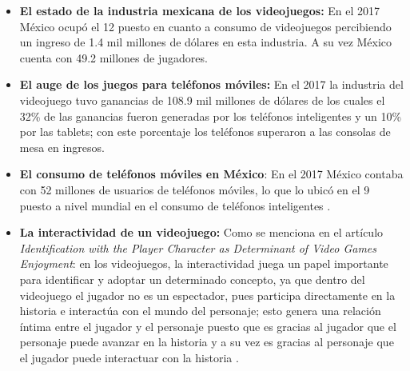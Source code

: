 \begin{itemize}
    \item \textbf{El estado de la industria mexicana de los videojuegos:} En el
    2017 México ocupó el 12 puesto en cuanto a consumo de videojuegos percibiendo
    un ingreso de 1.4 mil millones de dólares en esta industria. A su vez México
    cuenta con 49.2 millones de jugadores\cite{Ref_JuegosGanancia}.

    \item \textbf{El auge de los juegos para teléfonos móviles:} En el 2017 la
    industria del videojuego tuvo ganancias de 108.9 mil millones de dólares de
    los cuales el 32\% de las ganancias fueron generadas por los teléfonos
    inteligentes y un 10\% por las tablets; con este porcentaje los teléfonos
    superaron a las consolas de mesa en ingresos\cite{Ref_JuegosGanancia}.

    \item \textbf{El consumo de teléfonos móviles en México}: En el 2017 México
    contaba con 52 millones de usuarios de teléfonos móviles, lo que lo ubicó en
    el 9 puesto a nivel mundial en el consumo de teléfonos inteligentes
    \cite{Ref_TelefonosGanancia}.

    \item \textbf{La interactividad de un videojuego:} Como se menciona en el
    artículo \textit{Identification with the Player Character as Determinant
    of Video Games Enjoyment}: en los videojuegos, la interactividad juega un
    papel importante para identificar y adoptar un determinado concepto, ya que
    dentro del videojuego el jugador no es un espectador, pues participa
    directamente en la historia e interactúa con el mundo del personaje; esto
    genera una relación íntima entre el jugador y el personaje puesto que es
    gracias al jugador que el personaje puede avanzar en la historia y a su vez
    es gracias al personaje que el jugador puede interactuar con la historia
    \cite{PlayerIdentification}.
\end{itemize}



